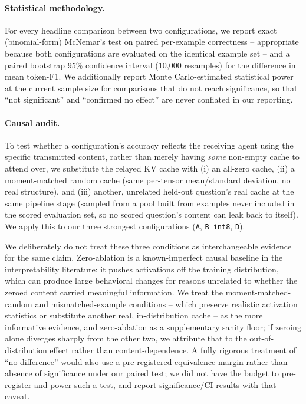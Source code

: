 \documentclass[11pt]{article}
\begin{document}
\paragraph{Statistical methodology.} For every headline comparison between
two configurations, we report exact (binomial-form) McNemar's test on
paired per-example correctness -- appropriate because both configurations
are evaluated on the identical example set -- and a paired bootstrap 95\%
confidence interval (10,000 resamples) for the difference in mean
token-F1. We additionally report Monte Carlo-estimated statistical power
at the current sample size for comparisons that do not reach significance,
so that ``not significant'' and ``confirmed no effect'' are never
conflated in our reporting.

\paragraph{Causal audit.} To test whether a configuration's accuracy
reflects the receiving agent using the specific transmitted content,
rather than merely having \emph{some} non-empty cache to attend over, we
substitute the relayed KV cache with (i) an all-zero cache, (ii) a
moment-matched random cache (same per-tensor mean/standard deviation, no
real structure), and (iii) another, unrelated held-out question's real
cache at the same pipeline stage (sampled from a pool built from examples
never included in the scored evaluation set, so no scored question's
content can leak back to itself). We apply this to our three strongest
configurations (\texttt{A}, \texttt{B\_int8}, \texttt{D}).

We deliberately do not treat these three conditions as interchangeable
evidence for the same claim. Zero-ablation is a known-imperfect causal
baseline in the interpretability literature: it pushes activations off the
training distribution, which can produce large behavioral changes for
reasons unrelated to whether the zeroed content carried meaningful
information. We treat the moment-matched-random and mismatched-example
conditions -- which preserve realistic activation statistics or substitute
another real, in-distribution cache -- as the more informative evidence,
and zero-ablation as a supplementary sanity floor; if zeroing alone
diverges sharply from the other two, we attribute that to the
out-of-distribution effect rather than content-dependence. A fully
rigorous treatment of ``no difference'' would also use a pre-registered
equivalence margin rather than absence of significance under our paired
test; we did not have the budget to pre-register and power such a test,
and report significance/CI results with that caveat.
\end{document}
